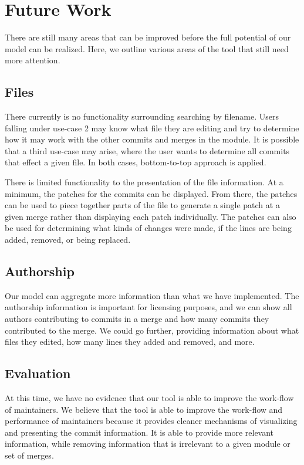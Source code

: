 \documentclass[conference, draftclsnofoot, draft]{IEEEtran}
\begin{document}
\section{Future Work}

There are still many areas that can be improved before the full potential of our
model can be realized. Here, we outline various areas of the tool that still need
more attention.

\subsection{Files}

There currently is no functionality surrounding searching by filename. Users falling
under use-case 2 may know what file they are editing and try to determine how it may
work with the other commits and merges in the module. It is possible that a third
use-case may arise, where the user wants to determine all commits that effect a
given file. In both cases, bottom-to-top approach is applied.

There is limited functionality to the presentation of the file information. At a
minimum, the patches for the commits can be displayed. From there, the patches can
be used to piece together parts of the file to generate a single patch at a given
merge rather than displaying each patch individually. The patches can also be used
for determining what kinds of changes were made, if the lines are being added,
removed, or being replaced.

\subsection{Authorship}

Our model can aggregate more information than what we have implemented. The
authorship information is important for licensing purposes, and we can show all
authors contributing to commits in a  merge and how many commits they contributed to
the merge. We could go further, providing information about what files they edited,
how many lines they added and removed, and more.

\subsection{Evaluation}

At this time, we have no evidence that our tool is able to improve the work-flow of
maintainers. We believe that the tool is able to improve the work-flow and
performance of maintainers because it provides cleaner mechanisms of visualizing and
presenting the commit information. It is able to provide more relevant information,
while removing information that is irrelevant to a given module or set of merges.
\end{document}
